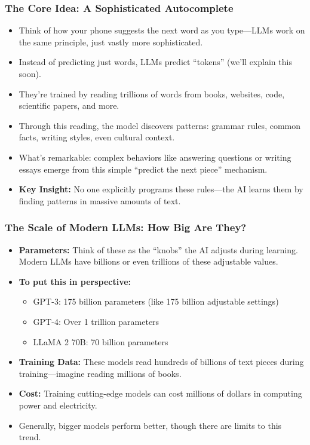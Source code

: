\documentclass{beamer}
\begin{document}
\begin{frame}
    \frametitle{The Core Idea: A Sophisticated Autocomplete}
    \begin{itemize}
        \item Think of how your phone suggests the next word as you type—LLMs work on the same principle, just vastly more sophisticated.
    \item Instead of predicting just words, LLMs predict ``tokens'' (we'll explain this soon).
        \item They're trained by reading trillions of words from books, websites, code, scientific papers, and more.
        \item Through this reading, the model discovers patterns: grammar rules, common facts, writing styles, even cultural context.
    \item What's remarkable: complex behaviors like answering questions or writing essays emerge from this simple ``predict the next piece'' mechanism.
        \item \textbf{Key Insight:} No one explicitly programs these rules—the AI learns them by finding patterns in massive amounts of text.
    \end{itemize}
\end{frame}

\begin{frame}
    \frametitle{The Scale of Modern LLMs: How Big Are They?}
    \begin{itemize}
    \item \textbf{Parameters:} Think of these as the ``knobs'' the AI adjusts during learning. Modern LLMs have billions or even trillions of these adjustable values.
        \item \textbf{To put this in perspective:}
        \begin{itemize}
            \item GPT-3: 175 billion parameters (like 175 billion adjustable settings)
            \item GPT-4: Over 1 trillion parameters
            \item LLaMA 2 70B: 70 billion parameters
        \end{itemize}
        \item \textbf{Training Data:} These models read hundreds of billions of text pieces during training—imagine reading millions of books.
        \item \textbf{Cost:} Training cutting-edge models can cost millions of dollars in computing power and electricity.
        \item Generally, bigger models perform better, though there are limits to this trend.
    \end{itemize}
\end{frame}
\end{document}
